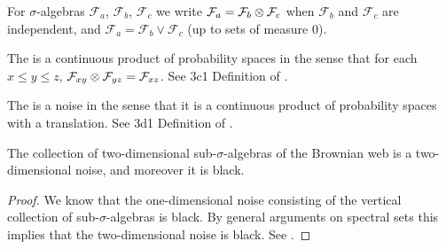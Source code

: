 {\begin{note}
  \newcommand{\F}{\mathcal{F}}

  For $\sigma$-algebras $\F_a$, $\F_b$, $\F_c$ we write $\F_a = \F_b
  \tensor \F_c$ when $\F_b$ and $\F_c$ are independent, and $\F_a =
  \F_b \vee \F_c$ (up to sets of measure $0$).
\end{note}

\begin{theorem}
  The \brownianwebnoise{}
  is a continuous product of probability spaces in the sense that
  for each $x \le y \le z$, $\mathcal{F}_{x y} \otimes \mathcal{F}_{y z} =
  \mathcal{F}_{x z}$.
  See 3c1 Definition of
  \cite{tsirelson-nonclassical-stochastic-flows}.
\end{theorem}

\begin{theorem}
  The \brownianwebnoise{} is a noise in the sense that it is a
  continuous product of probability spaces with a translation.
  See 3d1 Definition of
  \cite{tsirelson-nonclassical-stochastic-flows}.
\end{theorem}


\begin{theorem}
  The collection of two-dimensional sub-$\sigma$-algebras of the
  Brownian web is a two-dimensional noise, and moreover it is black.
\end{theorem}

\begin{proof}
  We know that the one-dimensional noise consisting of the vertical
  collection of sub-$\sigma$-algebras is black.  By general arguments
  on spectral sets this implies that the two-dimensional noise is
  black.  See \cite{tsirelson-classicality-blackness-spectrum}.
\end{proof}

}
